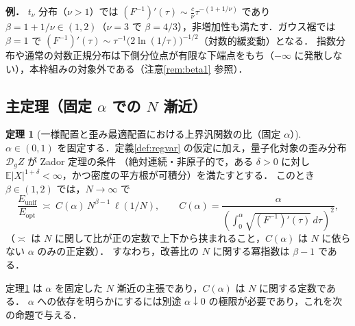 \documentclass[a4paper,10pt]{jsarticle}
\theoremstyle{definition}
\newtheorem{theorem}{定理}[section]
\newcommand{\Finv}{F^{-1}}
\newcommand{\E}{\mathbb{E}}
\newcommand{\dist}{\mathcal{D}_g}
\begin{document}
\noindent
\textbf{例．} $t_\nu$ 分布（$\nu>1$）では $(\Finv)'(\tau)\sim\frac{c}{\nu}\tau^{-(1+1/\nu)}$ であり $\beta=1+1/\nu\in(1,2)$（$\nu=3$ で $\beta=4/3$），非増加性も満たす．ガウス裾では $\beta=1$ で $(\Finv)'(\tau)\sim\tau^{-1}\bigl(2\ln(1/\tau)\bigr)^{-1/2}$（対数的緩変動）となる．
指数分布や通常の対数正規分布は下側分位点が有限な下端点をもち（$-\infty$ に発散しない），本枠組みの対象外である（注意\ref{rem:beta1} 参照）．

\subsection{主定理（固定 $\alpha$ での $N$ 漸近）}

\begin{theorem}[一様配置と歪み最適配置における上界汎関数の比（固定 $\alpha$）]
\label{thm:alpha}
$\alpha\in(0,1)$ を固定する．定義\ref{def:regvar} の仮定に加え，量子化対象の歪み分布 $\dist Z$ が Zador 定理の条件
（絶対連続・非原子的で，ある $\delta>0$ に対し $\E|X|^{1+\delta}<\infty$，かつ密度の平方根が可積分）を満たすとする．
このとき $\beta\in(1,2)$ では，$N\to\infty$ で
\begin{equation}
  \frac{E_{\mathrm{unif}}}{E_{\mathrm{opt}}}
  \;\asymp\;C(\alpha)\,N^{\beta-1}\,\ell(1/N),
  \qquad
  C(\alpha)=\frac{\alpha}{\left(\int_0^\alpha\sqrt{(\Finv)'(\tau)}\,d\tau\right)^{2}},
  \label{eq:thm-scaling}
\end{equation}
（$\asymp$ は $N$ に関して比が正の定数で上下から挟まれること，$C(\alpha)$ は $N$ に依らない $\alpha$ のみの正定数）．
すなわち，改善比の $N$ に関する冪指数は $\beta-1$ である．
\end{theorem}

定理\ref{thm:alpha} は $\alpha$ を固定した $N$ 漸近の主張であり，$C(\alpha)$ は $N$ に関する定数である．
$\alpha$ への依存を明らかにするには別途 $\alpha\downarrow0$ の極限が必要であり，これを次の命題で与える．
\end{document}
